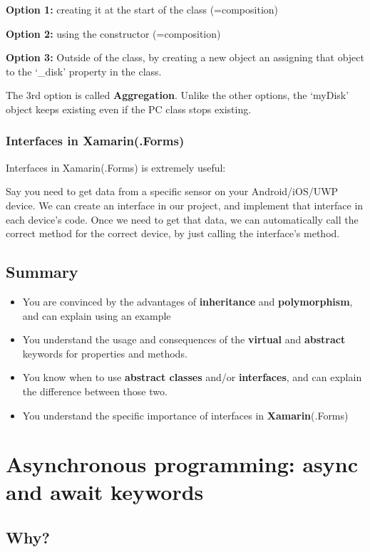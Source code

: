 \documentclass{article}
\newcommand{\bold}[1]{\textbf{#1}}
\begin{document}
\bold{Option 1:} creating it at the start of the class (=composition)

\bold{Option 2:} using the constructor (=composition)

\bold{Option 3:} Outside of the class, by creating a new object an assigning that object to the `\_disk' property in the class.

The 3rd option is called \bold{Aggregation}. Unlike the other options, the `myDisk' object keeps existing even if the PC class stops existing.

\subsubsection{Interfaces in Xamarin(.Forms)}

Interfaces in Xamarin(.Forms) is extremely useful: 

Say you need to get data from a specific sensor on your Android/iOS/UWP device. 
We can create an interface in our project, and implement that interface in each device's code.
Once we need to get that data, we can automatically call the correct method for the correct device,
by just calling the interface's method.

\subsection{Summary}

\begin{itemize}
    \item You are convinced by the advantages of \bold{inheritance} and \bold{polymorphism}, and can explain using an example
    \item  You understand the usage and consequences of the \bold{virtual} and \bold{abstract} keywords for properties and methods.
    \item  You know when to use \bold{abstract classes} and/or \bold{interfaces}, and can explain the difference between those two.
    \item  You understand the specific importance of interfaces in \bold{Xamarin}(.Forms)
\end{itemize}

\section{Asynchronous programming: async and await keywords}

\subsection{Why?}
\end{document}

